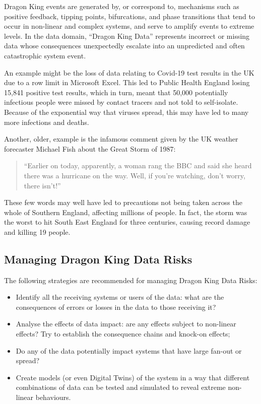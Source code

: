 Dragon King events are generated by, or correspond to, mechanisms such as positive feedback,
tipping points, bifurcations, and phase transitions that tend to occur in non-linear and complex
systems, and serve to amplify events to extreme levels.
In the data domain, “Dragon King Data” represents incorrect or missing data whose consequences
unexpectedly escalate into an unpredicted and often catastrophic system event.

An example might be the loss of data relating to Covid-19 test results in the UK due to a row limit
in Microsoft Excel.
This led to Public Health England losing 15,841 positive test results, which in turn,
meant that 50,000 potentially infectious people were missed by contact tracers and not told to
self-isolate.
Because of the exponential way that viruses spread,
this may have led to many more infections and deaths.

Another, older, example is the infamous comment given by the UK weather forecaster Michael Fish
about the Great Storm of 1987:

\begin{quote}
``Earlier on today, apparently, a woman rang the BBC and said she heard there was a hurricane on the way. Well, if you're watching, don't worry, there isn't!''
\end{quote}

These few words may well have led to precautions not being taken across the whole of Southern
England, affecting millions of people.
In fact, the storm was the worst to hit South East England for three centuries,
causing record damage and killing 19 people.

\subsection{Managing Dragon King Data Risks}
The following strategies are recommended for managing Dragon King Data Risks:
\begin{itemize}
\item Identify all the receiving systems or users of the data:
what are the consequences of errors or losses in the data to those receiving it?
\item Analyse the effects of data impact: are any effects subject to non-linear effects?
Try to establish the consequence chains and knock-on effects;
\item Do any of the data potentially impact systems that have large fan-out or spread?
\item Create models (or even Digital Twins) of the system in a way that different combinations
of data can be tested and simulated to reveal extreme non-linear behaviours.
\end{itemize}

